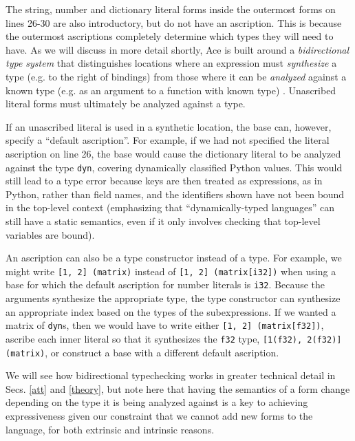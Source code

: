 \documentclass[10pt,preprint]{sigplanconf}
\begin{document}
{%
The string, number and dictionary literal forms inside the outermost forms on lines 26-30 are also  introductory, but do not have an ascription. This is because the outermost ascriptions completely determine which types they will need to have. As we will discuss in more detail shortly, Ace is built around a \emph{bidirectional type system} that distinguishes locations where an expression must \emph{synthesize} a type (e.g. to the right of bindings) from those where it can be \emph{analyzed} against a known type (e.g. as an argument to a function with known type) \cite{Lovas08abidirectional}. Unascribed literal forms must ultimately be analyzed against a type. 

If an unascribed literal is used in a synthetic location, the base can, however, specify a ``default ascription''. For example, if we had not specified the literal ascription on line 26, the base would cause the dictionary literal to be analyzed against the type \verb|dyn|, covering dynamically classified Python values. This would still lead to a type error because keys are then treated as expressions, as in Python, rather than field names, and the identifiers shown have not been bound in the top-level context (emphasizing that ``dynamically-typed languages'' can still have a static semantics, even if it only involves checking that top-level variables are bound).%

An ascription can also be a {type constructor} instead of a type. For example, we might write \verb|[1, 2] (matrix)| instead of \verb|[1, 2] (matrix[i32])| when using a base for which the default ascription for number literals is \verb|i32|. Because the arguments synthesize the appropriate type, the type constructor can synthesize an appropriate index based on the types of the subexpressions. If we wanted a matrix of \verb|dyn|s, then we would have to write either \verb|[1, 2] (matrix[f32])|, ascribe each inner literal so that it synthesizes the \verb|f32| type, \verb|[1(f32), 2(f32)] (matrix)|, or construct a base with a different default ascription. 

We will see how bidirectional typechecking  works in greater technical detail in Secs. \ref{att} and \ref{theory}, but note here that having the semantics of a form change depending on the type it is being analyzed against is a key to achieving expressiveness given our constraint that we cannot add  new forms to the language, for both extrinsic and intrinsic reasons.

}
\end{document}
